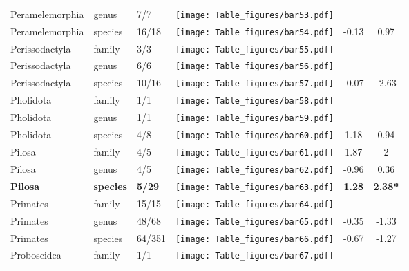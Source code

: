 \begin{longtable}{lL{1.8cm}C{2cm}lcc}
  Peramelemorphia & genus & 7/7 & \texttt{[image: Table\_figures/bar53.pdf]} &   &   \\ 
  Peramelemorphia & species & 16/18 & \texttt{[image: Table\_figures/bar54.pdf]} & -0.13 & 0.97 \\ 
  Perissodactyla & family & 3/3 & \texttt{[image: Table\_figures/bar55.pdf]} &   &   \\ 
  Perissodactyla & genus & 6/6 & \texttt{[image: Table\_figures/bar56.pdf]} &   &   \\ 
  Perissodactyla & species & 10/16 & \texttt{[image: Table\_figures/bar57.pdf]} & -0.07 & -2.63 \\ 
  Pholidota & family & 1/1 & \texttt{[image: Table\_figures/bar58.pdf]} &   &   \\ 
  Pholidota & genus & 1/1 & \texttt{[image: Table\_figures/bar59.pdf]} &   &   \\ 
  Pholidota & species & 4/8 & \texttt{[image: Table\_figures/bar60.pdf]} & 1.18 & 0.94 \\ 
  Pilosa & family & 4/5 & \texttt{[image: Table\_figures/bar61.pdf]} & 1.87 & 2 \\ 
  Pilosa & genus & 4/5 & \texttt{[image: Table\_figures/bar62.pdf]} & -0.96 & 0.36 \\ 
  \textbf{Pilosa} & \textbf{species} & \textbf{5/29} & \texttt{[image: Table\_figures/bar63.pdf]} & \textbf{1.28} & \textbf{2.38*} \\ 
  Primates & family & 15/15 & \texttt{[image: Table\_figures/bar64.pdf]} &   &   \\ 
  Primates & genus & 48/68 & \texttt{[image: Table\_figures/bar65.pdf]} & -0.35 & -1.33 \\ 
  Primates & species & 64/351 & \texttt{[image: Table\_figures/bar66.pdf]} & -0.67 & -1.27 \\ 
  Proboscidea & family & 1/1 & \texttt{[image: Table\_figures/bar67.pdf]} &   &   \\ 

\end{longtable}
